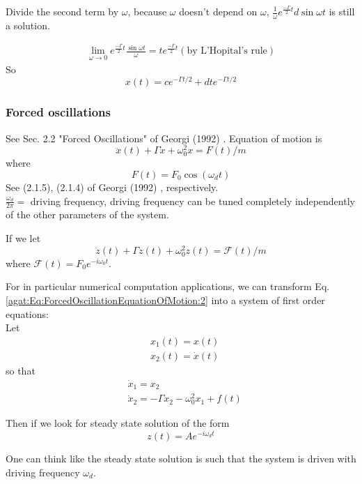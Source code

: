 Divide the second term by $\omega$, because $\omega$ doesn't depend on $\omega$, $\frac{1}{\omega} e^{\frac{-\Gamma}{2} t} d\sin{\omega t}$ is still a solution.

\[
\begin{gathered}
	\lim_{\omega \to 0} e^{ \frac{-\Gamma}{2} t} \frac{ \sin{ \omega t} }{\omega} = te^{\frac{-\Gamma}{2} t} (\text{by L'Hopital's rule})
\end{gathered}
\]
So
\[
x(t) = ce^{ - \Gamma t/2} + dte^{-\Gamma t/2}
\]

\subsubsection{Forced oscillations} See Sec. 2.2 "Forced Oscillations" of Georgi (1992) \cite{agat:Geor1992}.
Equation of motion is
\begin{equation}\label{agat:Eq:ForcedOscillationEquationOfMotion:2}
	\ddot{x}(t) + \Gamma \dot{x} + \omega_0^2 x = F(t) /m 
\end{equation}
where
\begin{equation}
	F(t) = F_0 \cos{(\omega_dt)}
\end{equation}
See (2.1.5), (2.1.4) of Georgi (1992) \cite{agat:Geor1992}, respectively. \\

$\frac{\omega_d}{2\pi} = $ driving frequency, driving frequency can be tuned completely independently of the other parameters of the system.

If we let 
\[
\ddot{z}(t) + \Gamma \dot{z}(t) + \omega_0^2 z(t) = \mathcal{F}(t) /m
\]
where $\mathcal{F}(t) = F_0 e^{-i \omega_0 t}$.

For in particular numerical computation applications, we can transform Eq. \ref{agat:Eq:ForcedOscillationEquationOfMotion:2} into a system of first order equations: \\
Let 
\[
\begin{aligned}
& x_1(t) = x(t) \\
& x_2(t) = \dot{x}(t)
\end{aligned}
\]
so that
\[
\begin{aligned}
& \dot{x}_1 = x_2 \\
& \dot{x}_2 = -\Gamma x_2 - \omega_0^2 x_1 + f(t)
\end{aligned}
\]


Then if we look for steady state solution of the form
\[
z(t) = A e^{-i \omega_d t}
\]

One can think like the steady state solution is such that the system is driven with driving frequency $\omega_d$.

